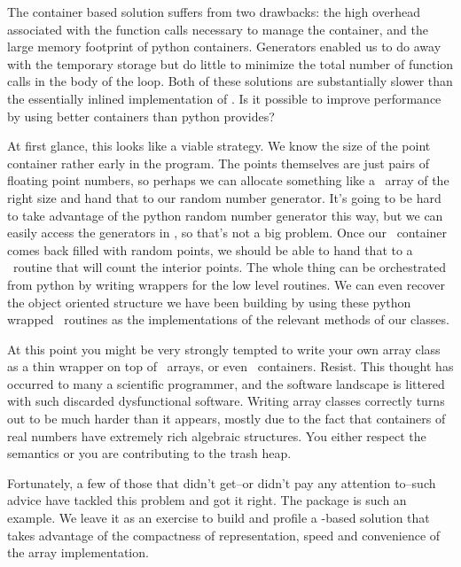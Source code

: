 The container based solution suffers from two drawbacks: the high overhead associated with the
function calls necessary to manage the container, and the large memory footprint of python
containers. Generators enabled us to do away with the temporary storage but do little to
minimize the total number of function calls in the body of the loop. Both of these solutions
are substantially slower than the essentially inlined implementation of .
Is it possible to improve performance by using better containers than python provides?

At first glance, this looks like a viable strategy. We know the size of the point container
rather early in the program. The points themselves are just pairs of floating point numbers, so
perhaps we can allocate something like a \cc\ array of the right size and hand that to our
random number generator. It's going to be hard to take advantage of the python random number
generator this way, but we can easily access the generators in , so that's not a big
problem. Once our \cc\ container comes back filled with random points, we should be able to
hand that to a \cc\ routine that will count the interior points. The whole thing can be
orchestrated from python by writing wrappers for the low level routines. We can even recover
the object oriented structure we have been building by using these python wrapped \cc\ routines
as the implementations of the relevant methods of our classes. 

At this point you might be very strongly tempted to write your own array class as a thin
wrapper on top of \cc\ arrays, or even \cpp\ containers. Resist. This thought has occurred to
many a scientific programmer, and the software landscape is littered with such discarded
dysfunctional software. Writing array classes correctly turns out to be much harder than it
appears, mostly due to the fact that containers of real numbers have extremely rich algebraic
structures. You either respect the semantics or you are contributing to the trash heap.

Fortunately, a few of those that didn't get--or didn't pay any attention to--such advice have
tackled this problem and got it right. The package \supercite{numpy} is such an
example. We leave it as an exercise to build and profile a -based solution
that takes advantage of the compactness of representation, speed and convenience of the array
implementation.

